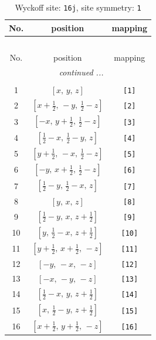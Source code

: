 \documentclass[fleqn,8pt]{jsarticle}
\begin{document}
\begin{longtable}{ccc}
\caption{Wyckoff site: {\tt 16j}, site symmetry: {\tt 1}}
 \\
 \hline \hline
No. & position & mapping \\ \hline \endfirsthead

\multicolumn{2}{l}{\tablename\ \thetable{}} \\
 \hline \hline
No. & position & mapping \\ \hline \endhead

 \hline \hline
\multicolumn{2}{r}{\footnotesize\it continued ...} \\ \endfoot

 \hline \hline
\multicolumn{2}{r}{} \\ \endlastfoot

1 & $\left[ x,\, y,\, z \right]$ & {\tt [1]} \\ \hline
2 & $\left[ x + \frac{1}{2},\, - y,\, \frac{1}{2} - z \right]$ & {\tt [2]} \\ \hline
3 & $\left[ - x,\, y + \frac{1}{2},\, \frac{1}{2} - z \right]$ & {\tt [3]} \\ \hline
4 & $\left[ \frac{1}{2} - x,\, \frac{1}{2} - y,\, z \right]$ & {\tt [4]} \\ \hline
5 & $\left[ y + \frac{1}{2},\, - x,\, \frac{1}{2} - z \right]$ & {\tt [5]} \\ \hline
6 & $\left[ - y,\, x + \frac{1}{2},\, \frac{1}{2} - z \right]$ & {\tt [6]} \\ \hline
7 & $\left[ \frac{1}{2} - y,\, \frac{1}{2} - x,\, z \right]$ & {\tt [7]} \\ \hline
8 & $\left[ y,\, x,\, z \right]$ & {\tt [8]} \\ \hline
9 & $\left[ \frac{1}{2} - y,\, x,\, z + \frac{1}{2} \right]$ & {\tt [9]} \\ \hline
10 & $\left[ y,\, \frac{1}{2} - x,\, z + \frac{1}{2} \right]$ & {\tt [10]} \\ \hline
11 & $\left[ y + \frac{1}{2},\, x + \frac{1}{2},\, - z \right]$ & {\tt [11]} \\ \hline
12 & $\left[ - y,\, - x,\, - z \right]$ & {\tt [12]} \\ \hline
13 & $\left[ - x,\, - y,\, - z \right]$ & {\tt [13]} \\ \hline
14 & $\left[ \frac{1}{2} - x,\, y,\, z + \frac{1}{2} \right]$ & {\tt [14]} \\ \hline
15 & $\left[ x,\, \frac{1}{2} - y,\, z + \frac{1}{2} \right]$ & {\tt [15]} \\ \hline
16 & $\left[ x + \frac{1}{2},\, y + \frac{1}{2},\, - z \right]$ & {\tt [16]} \\
\end{longtable}
\end{document}
